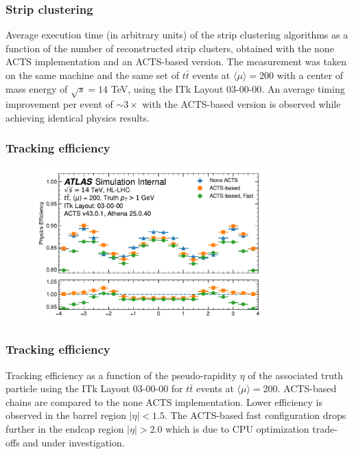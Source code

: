 \documentclass[aspectratio=169]{beamer}
\begin{document}
\begin{frame}
\frametitle{Strip clustering}
Average execution time (in arbitrary units) of the strip clustering algorithms as a function of the number of reconstructed strip clusters, obtained with the none ACTS implementation and an ACTS-based version. The measurement was taken on the same machine and the same set of $t\bar{t}$ events at $\langle \mu \rangle = 200$ with a center of mass energy of $\sqrt{s}=14$ TeV, using the ITk Layout 03-00-00. An average timing improvement per event of $\sim3\times$ with the ACTS-based version is observed while achieving identical physics results.
\end{frame}


\begin{frame}
\frametitle{Tracking efficiency}
\begin{figure}[h]
    \centering
    \includegraphics[width=0.8\textwidth]{plots/tracking_efficiency_physics.pdf}
\end{figure}
\end{frame}

\begin{frame}
\frametitle{Tracking efficiency}
Tracking efficiency as a function of the pseudo-rapidity $\eta$ of the associated truth particle using the ITk Layout 03-00-00 for $t\bar{t}$ events at $\langle \mu \rangle = 200$. ACTS-based chains are compared to the none ACTS implementation. Lower efficiency is observed in the barrel region $|\eta| < 1.5$. The ACTS-based fast configuration drops further in the endcap region $|\eta| > 2.0$ which is due to CPU optimization trade-offs and under investigation.
\end{frame}
\end{document}
